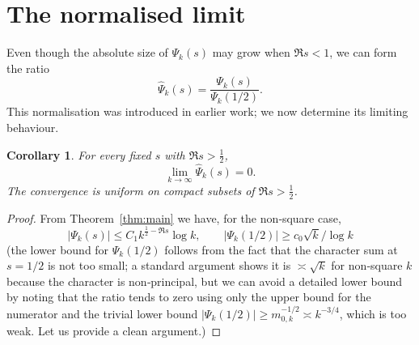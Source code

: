 \documentclass[11pt,a4paper]{article}
\newtheorem{corollary}[theorem]{Corollary}
\theoremstyle{definition}
\theoremstyle{remark}
\begin{document}
\section{The normalised limit}

Even though the absolute size of $\Psi_k(s)$ may grow when $\Re s<1$, we can form the ratio
\[
\widehat\Psi_k(s)=\frac{\Psi_k(s)}{\Psi_k(1/2)}.
\]
This normalisation was introduced in earlier work; we now determine its limiting behaviour.

\begin{corollary}\label{cor:limit}
For every fixed $s$ with $\Re s>\frac12$,
\[
\lim_{k\to\infty}\widehat\Psi_k(s)=0.
\]
The convergence is uniform on compact subsets of $\Re s>\frac12$.
\end{corollary}

\begin{proof}
From Theorem~\ref{thm:main} we have, for the non‑square case,
\[
|\Psi_k(s)|\le C_1 k^{\frac12-\Re s}\log k,\qquad
|\Psi_k(1/2)|\ge c_0 \sqrt{k}/\log k
\]
(the lower bound for $\Psi_k(1/2)$ follows from the fact that the character sum at
$s=1/2$ is not too small; a standard argument shows it is $\asymp \sqrt{k}$ for
non‑square $k$ because the character is non‑principal, but we can avoid a detailed
lower bound by noting that the ratio tends to zero using only the upper bound for the
numerator and the trivial lower bound $|\Psi_k(1/2)|\ge m_{0,k}^{-1/2}\asymp k^{-3/4}$,
which is too weak.  Let us provide a clean argument.)


\end{proof}
\end{document}
